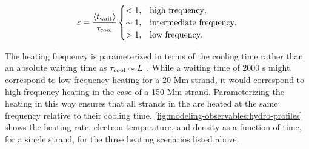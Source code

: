 \begin{equation}\label{eq:modeling-observables:heating_types}
    \varepsilon = \frac{\langle t_{\textup{wait}}\rangle}{\tau_{\textup{cool}}}
    \begin{cases} 
        < 1, &  \text{high frequency},\\
        \sim1, & \text{intermediate frequency}, \\
        > 1, & \text{low frequency}.
     \end{cases}
\end{equation}

The heating frequency is parameterized in terms of the cooling time rather than an absolute waiting time as $\tau_{\textup{cool}}\sim L$ \citep[see appendix of][]{cargill_active_2014}. While a waiting time of 2000 s might correspond to low-frequency heating for a 20 Mm strand, it would correspond to high-frequency heating in the case of a 150 Mm strand. Parameterizing the heating in this way ensures that all strands in the \AR{} are heated at the same frequency relative to their cooling time. \autoref{fig:modeling-observables:hydro-profiles} shows the heating rate, electron temperature, and density as a function of time, for a single strand, for the three heating scenarios listed above.

